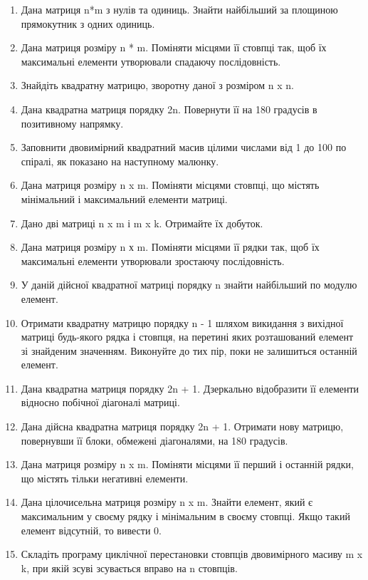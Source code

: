 \documentclass[]{article}
\begin{document}
\begin{enumerate}
\def\labelenumi{\arabic{enumi})}

\item
  Дана матриця n*m з нулів та одиниць. Знайти найбільший за площиною
  прямокутник з одних одиниць.

\item
  Дана матриця розміру n * m. Поміняти місцями її стовпці так, щоб їх
  максимальні елементи утворювали спадаючу послідовність.
\item
  Знайдіть квадратну матрицю, зворотну даної з розміром n x n.
\item
  Дана квадратна матриця порядку 2n. Повернути її на 180 градусів в
  позитивному напрямку.
\item
  Заповнити двовимірний квадратний масив цілими числами від 1 до 100 по
  спіралі, як показано на наступному малюнку.
\item
  Дана матриця розміру n x m. Поміняти місцями стовпці, що містять
  мінімальний і максимальний елементи матриці.
\item
  Дано дві матриці n x m і m x k. Отримайте їх добуток.
\item
  Дана матриця розміру n х m. Поміняти місцями її рядки так, щоб їх
  максимальні елементи утворювали зростаючу послідовність.
\item
  У даній дійсної квадратної матриці порядку n знайти найбільший по
  модулю елемент.
\item
  Отримати квадратну матрицю порядку n - 1 шляхом викидання з вихідної
  матриці будь-якого рядка і стовпця, на перетині яких розташований
  елемент зі знайденим значенням. Виконуйте до тих пір, поки не
  залишиться останній елемент.
\item
  Дана квадратна матриця порядку 2n + 1. Дзеркально відобразити її
  елементи відносно побічної діагоналі матриці.
\item
  Дана дійсна квадратна матриця порядку 2n + 1. Отримати нову матрицю,
  повернувши її блоки, обмежені діагоналями, на 180 градусів.
\item
  Дана матриця розміру n x m. Поміняти місцями її перший і останній
  рядки, що містять тільки негативні елементи.
\item
  Дана цілочисельна матриця розміру n x m. Знайти елемент, який є
  максимальним у своєму рядку і мінімальним в своєму стовпці. Якщо такий
  елемент відсутній, то вивести 0.
\item
  Складіть програму циклічної перестановки стовпців двовимірного масиву
  m x k, при якій зсуві зсувається вправо на n стовпців.

\end{enumerate}
\end{document}
